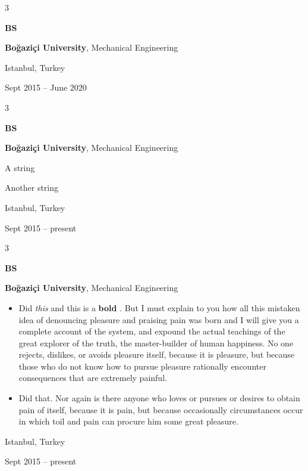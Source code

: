 \documentclass[10pt, letterpaper]{article}
\newenvironment{summary}{
    \begin{description}[
        topsep=0.10 cm,
        parsep=0.10 cm,
        partopsep=0pt,
        itemsep=0pt,
        leftmargin=0.4 cm + 10pt
    ]
}{
    \end{description}
} %
\newenvironment{highlights}{
    \begin{itemize}[
        topsep=0.10 cm,
        parsep=0.10 cm,
        partopsep=0pt,
        itemsep=0pt,
        leftmargin=0.4 cm + 10pt
    ]
}{
    \end{itemize}
} %
\newenvironment{threecolentry}[3][]{
    \onecolentry
    \def\thirdColumn{#3}
    \setcolumnwidth{1 cm, \fill, 4.5 cm}
    \begin{paracol}{3}
    {\raggedright #2} \switchcolumn
}{
    \switchcolumn \raggedleft \thirdColumn
    \end{paracol}
    \endonecolentry
} %
\let\hrefWithoutArrow\href
\renewcommand{\href}[2]{\hrefWithoutArrow{#1}{\ifthenelse{\equal{#2}{}}{ }{#2 }\raisebox{.15ex}{\footnotesize \faExternalLink*}}}
\begin{document}
        \vspace{0.2 cm}

        \begin{threecolentry}{\textbf{BS}}{
            Istanbul, Turkey

        Sept 2015 – June 2020
        }
            \textbf{Boğaziçi University}, Mechanical Engineering
        \end{threecolentry}

        \vspace{0.2 cm}

        \begin{threecolentry}{\textbf{BS}}{
            Istanbul, Turkey

        Sept 2015 – present
        }
            \textbf{Boğaziçi University}, Mechanical Engineering
            \begin{summary}
                \item A string
                \item Another string
            \end{summary}
        \end{threecolentry}

        \vspace{0.2 cm}

        \begin{threecolentry}{\textbf{BS}}{
            Istanbul, Turkey

        Sept 2015 – present
        }
            \textbf{Boğaziçi University}, Mechanical Engineering
            \begin{highlights}
                \item Did \textit{this} and this is a \textbf{bold} \href{https://example.com}{link}. But I must explain to you how all this mistaken idea of denouncing pleasure and praising pain was born and I will give you a complete account of the system, and expound the actual teachings of the great explorer of the truth, the master-builder of human happiness. No one rejects, dislikes, or avoids pleasure itself, because it is pleasure, but because those who do not know how to pursue pleasure rationally encounter consequences that are extremely painful.
                \item Did that. Nor again is there anyone who loves or pursues or desires to obtain pain of itself, because it is pain, but because occasionally circumstances occur in which toil and pain can procure him some great pleasure.
            \end{highlights}
        \end{threecolentry}
\end{document}
